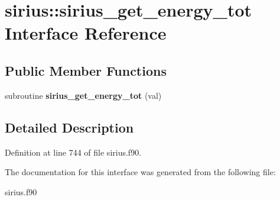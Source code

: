 \hypertarget{interfacesirius_1_1sirius__get__energy__tot}{}\section{sirius\+:\+:sirius\+\_\+get\+\_\+energy\+\_\+tot Interface Reference}
\label{interfacesirius_1_1sirius__get__energy__tot}
\subsection*{Public Member Functions}
\begin{DoxyCompactItemize}
\item 
\hypertarget{interfacesirius_1_1sirius__get__energy__tot_a89b7784760fff7638c2758a4612ddc7b}{}subroutine {\bfseries sirius\+\_\+get\+\_\+energy\+\_\+tot} (val)\label{interfacesirius_1_1sirius__get__energy__tot_a89b7784760fff7638c2758a4612ddc7b}

\end{DoxyCompactItemize}


\subsection{Detailed Description}


Definition at line 744 of file sirius.\+f90.



The documentation for this interface was generated from the following file\+:\begin{DoxyCompactItemize}
\item 
sirius.\+f90\end{DoxyCompactItemize}
